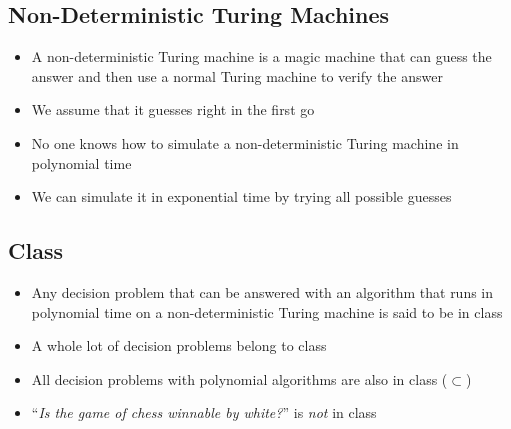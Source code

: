 
\begin{slide}
\section{Non-Deterministic Turing Machines}

\begin{PauseHighLight}
  \begin{itemize}
  \item A non-deterministic Turing machine is a magic machine that can
    guess the answer and then use a normal Turing machine to verify the
    answer\pause
  \item We assume that it guesses right in the first go\pause
  \item No one knows how to simulate a non-deterministic Turing machine
    in polynomial time\pause
  \item We can simulate it in exponential time by trying all possible
    guesses\pause
  \end{itemize}
\end{PauseHighLight}

\end{slide}


\begin{slide}
\section{Class }

\begin{PauseHighLight}
  \begin{itemize}
  \item Any decision problem that can be answered with an algorithm that
    runs in polynomial time on a non-deterministic Turing machine is
    said to be in class \pause
  \item A whole lot of decision problems belong to class~\pause
  \item All decision problems with polynomial algorithms are also in class
      ($\subset$)\pause
  \item ``\textit{Is the game of chess winnable by white?}'' is \emph{not} in class~\pause
  \end{itemize}
\end{PauseHighLight}

\end{slide}

